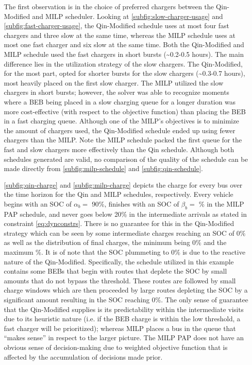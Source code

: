 \documentclass[utf8]{FrontiersinHarvard}
\newcommand{\EDIT}[1]{{\color{blue}#1}}                                         %
\newcommand{\bcharge}{0.7 }                                                     %
\newcommand{\mincharge}{20\% }                                                  %
\newcommand{\batsize}{388 }                                                     %
\begin{document}
The first observation is in the choice of preferred chargers between the Qin-Modified and MILP scheduler. Looking at
\autoref{subfig:slow-charger-usage} and \autoref{subfig:fast-charger-usage}, the Qin-Modified schedule uses at most four
fast chargers and three slow at the same time, whereas the MILP schedule uses at most one fast charger and six slow at
the same time. Both the Qin-Modified and MILP schedule used the fast chargers in short bursts (\textasciitilde 0.2-0.5 hours). The main
difference lies in the utilization strategy of the slow chargers. The Qin-Modified, for the most part, opted for shorter
bursts for the slow chargers (\textasciitilde{}0.3-0.7 hours), most heavily placed on the first slow charger. The MILP
utilized the slow chargers in short bursts; however, the solver was able to recognize moments where a BEB being placed
in a slow charging queue for a longer duration was more cost-effective (with respect to the objective function) than
placing the BEB in a fast charging queue. Although one of the MILP's objectives is to minimize the amount of chargers
used, the Qin-Modified schedule ended up using fewer chargers than the MILP. Note the MILP schedule
packed the first queue for the fast and slow chargers more effectively than the Qin schedule. Although both schedules
generated are valid, no comparison of the quality of the schedule can be made directly from
\autoref{subfig:milp-schedule} and \autoref{subfig:qin-schedule}.

\autoref{subfig:qin-charge} and \autoref{subfig:milp-charge} depicts the \EDIT{charge} for every bus over the time
horizon for the Qin and MILP schedules, respectively. Every vehicle begins with an SOC of \(\alpha_b =\) 90\%, finishes with an
SOC of \(\beta_b =\) \fpeval{\bcharge *100}\% in the MILP PAP schedule, and never goes below \mincharge in the intermediate
arrivals as stated in constraint \autoref{eq:dynconstrs}. There is no guarantee for this in the Qin-Modified strategy
which can be seen by some intermediate charges reaching an SOC of 0\% as well as the distribution of final charges, the
minimum being 0\% and the maximum \fpeval{trunc(\fpeval{368 / \batsize * 100}, 3)}\%. \EDIT{It is of note that the SOC plummeting to 0\% is due to the reactive nature of the Qin-Modified. Specifically, the schedule utilized in this example contains some BEBs that begin with routes that deplete the SOC by small amounts that do not bypass the threshold. These routes are followed by small charge windows which are then proceeded by large routes depleting the SOC by a significant amount resulting in the SOC reaching 0\%.} The only sense of guarantee that the
Qin-Modified supplies is its predictability within the intermediate visits due to its heuristic nature (i.e. if the BEB
charge is within the low threshold, a fast charger will be prioritized); whereas MILP places a bus in the queue that
``makes sense'' in respect to the larger picture. The MILP PAP does not have an obvious sense of decision-making due to
weighted objective function that is affected by the accumulation of decisions made prior.
\end{document}
